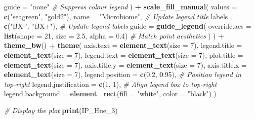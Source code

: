 \documentclass[
  11pt,
]{article}
\newenvironment{Shaded}{\begin{snugshade}}{\end{snugshade}}
\newcommand{\AttributeTok}[1]{\textcolor[rgb]{0.13,0.29,0.53}{#1}}
\newcommand{\CommentTok}[1]{\textcolor[rgb]{0.56,0.35,0.01}{\textit{#1}}}
\newcommand{\DecValTok}[1]{\textcolor[rgb]{0.00,0.00,0.81}{#1}}
\newcommand{\FloatTok}[1]{\textcolor[rgb]{0.00,0.00,0.81}{#1}}
\newcommand{\FunctionTok}[1]{\textcolor[rgb]{0.13,0.29,0.53}{\textbf{#1}}}
\newcommand{\NormalTok}[1]{#1}
\newcommand{\SpecialCharTok}[1]{\textcolor[rgb]{0.81,0.36,0.00}{\textbf{#1}}}
\newcommand{\StringTok}[1]{\textcolor[rgb]{0.31,0.60,0.02}{#1}}
\begin{document}
\begin{Shaded}
\begin{Highlighting}[]
    \AttributeTok{guide =} \StringTok{"none"} \CommentTok{\# Suppress colour legend}
\NormalTok{  ) }\SpecialCharTok{+}
  \FunctionTok{scale\_fill\_manual}\NormalTok{(}
    \AttributeTok{values =} \FunctionTok{c}\NormalTok{(}\StringTok{"seagreen"}\NormalTok{, }\StringTok{"gold2"}\NormalTok{),}
    \AttributeTok{name =} \StringTok{"Microbiome"}\NormalTok{,  }\CommentTok{\# Update legend title}
    \AttributeTok{labels =} \FunctionTok{c}\NormalTok{(}\StringTok{"BX{-}"}\NormalTok{, }\StringTok{"BX+"}\NormalTok{),  }\CommentTok{\# Update legend labels}
    \AttributeTok{guide =} \FunctionTok{guide\_legend}\NormalTok{(}
      \AttributeTok{override.aes =} \FunctionTok{list}\NormalTok{(}\AttributeTok{shape =} \DecValTok{21}\NormalTok{, }\AttributeTok{size =} \FloatTok{2.5}\NormalTok{, }\AttributeTok{alpha =} \FloatTok{0.4}\NormalTok{) }\CommentTok{\# Match point aesthetics}
\NormalTok{    )}
\NormalTok{  ) }\SpecialCharTok{+}
  \FunctionTok{theme\_bw}\NormalTok{() }\SpecialCharTok{+}
  \FunctionTok{theme}\NormalTok{(}
    \AttributeTok{axis.text =} \FunctionTok{element\_text}\NormalTok{(}\AttributeTok{size =} \DecValTok{7}\NormalTok{),}
    \AttributeTok{legend.title =} \FunctionTok{element\_text}\NormalTok{(}\AttributeTok{size =} \DecValTok{7}\NormalTok{),}
    \AttributeTok{legend.text =} \FunctionTok{element\_text}\NormalTok{(}\AttributeTok{size =} \DecValTok{7}\NormalTok{),}
    \AttributeTok{plot.title =} \FunctionTok{element\_text}\NormalTok{(}\AttributeTok{size =} \DecValTok{7}\NormalTok{),}
    \AttributeTok{axis.title.y =} \FunctionTok{element\_text}\NormalTok{(}\AttributeTok{size =} \DecValTok{7}\NormalTok{),}
    \AttributeTok{axis.title.x =} \FunctionTok{element\_text}\NormalTok{(}\AttributeTok{size =} \DecValTok{7}\NormalTok{),}
    \AttributeTok{legend.position =} \FunctionTok{c}\NormalTok{(}\FloatTok{0.2}\NormalTok{, }\FloatTok{0.95}\NormalTok{),  }\CommentTok{\# Position legend in top{-}right}
    \AttributeTok{legend.justification =} \FunctionTok{c}\NormalTok{(}\DecValTok{1}\NormalTok{, }\DecValTok{1}\NormalTok{),   }\CommentTok{\# Align legend box to top{-}right}
    \AttributeTok{legend.background =} \FunctionTok{element\_rect}\NormalTok{(}\AttributeTok{fill =} \StringTok{"white"}\NormalTok{, }\AttributeTok{color =} \StringTok{"black"}\NormalTok{)}
\NormalTok{  )}

\CommentTok{\# Display the plot}
\FunctionTok{print}\NormalTok{(IP\_Hue\_3)}
\end{Highlighting}
\end{Shaded}
\end{document}

